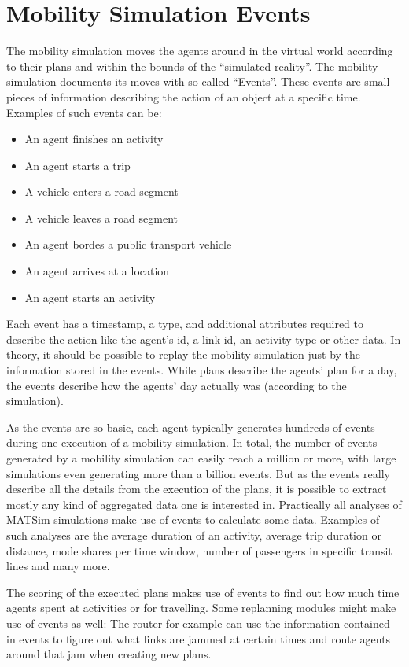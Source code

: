 \section{Mobility Simulation Events}
The mobility simulation moves the agents around in the virtual world according
to their plans and within the bounds of the ``simulated reality''. The
mobility simulation documents its moves with so-called ``Events''. These events
are small pieces of information describing the action of an object at a
specific time. Examples of such events can be:
\begin{itemize}\styleItemize
  \item An agent finishes an activity
  \item An agent starts a trip
  \item A vehicle enters a road segment
  \item A vehicle leaves a road segment
  \item An agent bordes a public transport vehicle
  \item An agent arrives at a location
  \item An agent starts an activity
\end{itemize}
Each event has a timestamp, a type, and additional attributes required to
describe the action like the agent's id, a link id, an activity type or other
data. In theory, it should be possible to replay the mobility simulation just by
the information stored in the events. While plans describe the agents' plan for
a day, the events describe how the agents' day actually was (according to the
simulation).

As the events are so basic, each agent typically generates hundreds of events
during one execution of a mobility simulation. In total, the number of events
generated by a mobility simulation can easily reach a million or more, with
large simulations even generating more than a billion events. But as the events
really describe all the details from the execution of the plans, it is possible
to extract mostly any kind of aggregated data one is interested in. Practically
all analyses of MATSim simulations make use of events to calculate some data.
Examples of such analyses are the average duration of an activity, average trip
duration or distance, mode shares per time window, number of passengers in
specific transit lines and many more.

The scoring of the executed plans makes use of events to find out how much time
agents spent at activities or for travelling. Some replanning modules might
make use of events as well: The router for example can use the information
contained in events to figure out what links are jammed at certain times and
route agents around that jam when creating new plans.


